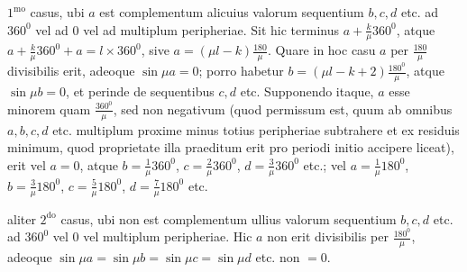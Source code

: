 $1^{\mathrm{mo}}$ casus, ubi $a$ est complementum alicuius valorum sequentium $b,c,d$ etc. ad $360^{0}$ vel ad $0$ vel ad multiplum peripheriae. Sit hic terminus $a+\frac{k}{\mu}360^{0}$,
atque $a+\frac{k}{\mu}360^{0}+a=l\times360^{0}$, sive $a=(\mu l-k)\frac{180}{\mu}$. Quare in hoc casu $a$ per $\frac{180}{\mu}$ divisibilis erit, adeoque $\sin\mu a=0$; porro habetur $b=(\mu l-k+2)\frac{180^{0}}{\mu}$, atque $\sin\mu b=0$, et perinde de sequentibus $c,d$ etc. Supponendo itaque, $a$ esse minorem quam $\frac{360^{0}}{\mu}$, sed non negativum (quod permissum est, quum ab omnibus $a,b,c,d$ etc. multiplum proxime minus totius peripheriae subtrahere et ex residuis minimum, quod proprietate illa praeditum erit pro periodi initio accipere liceat), erit vel $a=0$, atque $b=\frac1\mu360^{0}$, $c=\frac2\mu360^{0}$, $d=\frac3\mu360^{0}$ etc.; vel $a=\frac1\mu180^{0}$, $b=\frac3\mu180^{0}$, $c=\frac5\mu180^{0}$, $d=\frac7\mu180^{0}$ etc.

aliter $2^{\mathrm{do}}$ casus, ubi non est complementum ullius valorum sequentium $b,c,d$ etc. ad $360^{0}$ vel $0$ vel multiplum peripheriae. Hic $a$ non erit divisibilis per $\frac{180^{0}}{\mu}$, adeoque $\sin\mu a=\sin\mu b=\sin\mu c=\sin\mu d$ etc. non $=0$.

